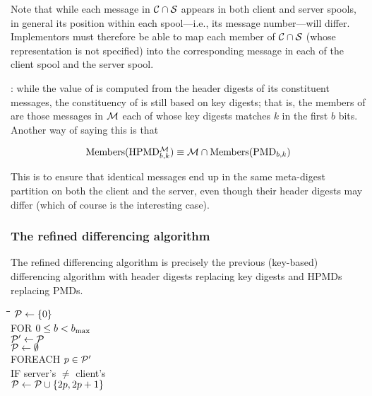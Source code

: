 Note that while each message in ${\cal C}\cap{\cal S}$ appears
in both client and server spools, in general its position within each
spool---i.e., its message number---will differ.  Implementors must
therefore be able to map each member of ${\cal C}\cap{\cal S}$
(whose representation is not specified) into the corresponding message
in each of the client spool and the server spool.

: while the value of 
is computed from the header digests of its constituent messages, the
constituency of  is still based on key
digests; that is, the members of  are those
messages in ${\cal M}$ each of whose key digests matches $k$ in the
first $b$ bits.  Another way of saying this is that

\begin{displaymath}
\mbox{Members}(\mbox{HPMD$^{{\cal M}}_{b,k}$}) \equiv {\cal M}
\cap \mbox{Members}(\mbox{PMD$_{b,k}$})
\end{displaymath}

\noindent
This is to ensure that identical messages end up in the same
meta-digest partition on both the client and the server, even though
their header digests may differ (which of course is the interesting
case).

\subsubsection{The refined differencing algorithm}

The refined differencing algorithm is precisely the previous
(key-based) differencing algorithm with header digests replacing key
digests and HPMDs replacing PMDs.

\begin{tabbing}
\hspace*{.125in}\=\hspace*{.125in}\=\hspace*{.125in}\=\kill
${\cal P} \gets \{0\}$ \\
FOR $0 \leq b < {b_{\rm max}}{}$ \\
\>${\cal P'} \gets {\cal P}$ \\
\>${\cal P} \gets \emptyset$ \\
\>FOREACH $p \in {\cal P'}$ \\
\>\>IF server's  $\not=$ client's  \\
\>\>\>${\cal P} \gets {\cal P} \cup \{2p, 2p+1\}$
\end{tabbing}

